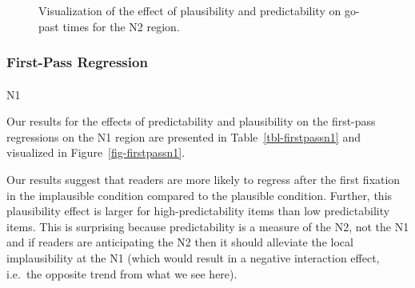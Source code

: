 \documentclass[
  12pt,
  letterpaper,
]{scrreprt}
\makeatletter
\let\oldparagraph\paragraph
\renewcommand{\paragraph}{
    \@ifstar
      \xxxParagraphStar
      \xxxParagraphNoStar
  }
\newcommand{\xxxParagraphStar}[1]{\oldparagraph*{#1}\mbox{}}
\newcommand{\xxxParagraphNoStar}[1]{\oldparagraph{#1}\mbox{}}
\makeatother
\begin{document}
\begin{figure}[htbp]

\caption{\label{fig-gopastn2}Visualization of the effect of plausibility
and predictability on go-past times for the N2 region.}


\end{figure}%

\subsubsection{First-Pass Regression}\label{first-pass-regression-1}

\paragraph{N1}\label{n1-7}

Our results for the effects of predictability and plausibility on the
first-pass regressions on the N1 region are presented in
Table~\ref{tbl-firstpassn1} and visualized in
Figure~\ref{fig-firstpassn1}.

Our results suggest that readers are more likely to regress after the
first fixation in the implausible condition compared to the plausible
condition. Further, this plausibility effect is larger for
high-predictability items than low predictability items. This is
surprising because predictability is a measure of the N2, not the N1 and
if readers are anticipating the N2 then it should alleviate the local
implausibility at the N1 (which would result in a negative interaction
effect, i.e.~the opposite trend from what we see here).
\end{document}
